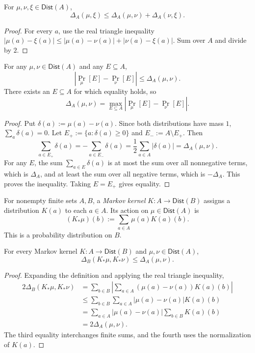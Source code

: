 \begin{lemma}\label{lem:security:tv-triangle}
For $\mu,\nu,\xi\in\mathsf{Dist}(A)$,
\[
 \Delta_A(\mu,\xi)\leq\Delta_A(\mu,\nu)+\Delta_A(\nu,\xi).
\]
\end{lemma}
\begin{proof}
For every $a$, use the real triangle inequality
$|\mu(a)-\xi(a)|\leq|\mu(a)-\nu(a)|+|\nu(a)-\xi(a)|$. Sum over $A$ and divide by $2$.
\end{proof}

\begin{lemma}\label{lem:security:events}
For any $\mu,\nu\in\mathsf{Dist}(A)$ and any $E\subseteq A$,
\[
 |\Pr_\mu[E]-\Pr_\nu[E]|\leq\Delta_A(\mu,\nu).
\]
There exists an $E\subseteq A$ for which equality holds, so
\[
 \Delta_A(\mu,\nu)=\max_{E\subseteq A}|\Pr_\mu[E]-\Pr_\nu[E]|.
\]
\end{lemma}
\begin{proof}
Put $\delta(a):=\mu(a)-\nu(a)$. Since both distributions have mass $1$, $\sum_a\delta(a)=0$. Let $E_+:=\{a:\delta(a)\geq0\}$ and $E_-:=A\setminus E_+$. Then
\[
 \sum_{a\in E_+}\delta(a)=-\sum_{a\in E_-}\delta(a)
   =\frac12\sum_{a\in A}|\delta(a)|=\Delta_A(\mu,\nu).
\]
For any $E$, the sum $\sum_{a\in E}\delta(a)$ is at most the sum over all nonnegative terms, which is $\Delta_A$, and at least the sum over all negative terms, which is $-\Delta_A$. This proves the inequality. Taking $E=E_+$ gives equality.
\end{proof}

\begin{definition}\label{def:security:kernel}
For nonempty finite sets $A,B$, a \emph{Markov kernel} $K:A\to\mathsf{Dist}(B)$ assigns a distribution $K(a)$ to each $a\in A$. Its action on $\mu\in\mathsf{Dist}(A)$ is
\[
 (K_*\mu)(b):=\sum_{a\in A}\mu(a)K(a)(b).
\]
This is a probability distribution on $B$.
\end{definition}

\begin{lemma}\label{lem:security:data-processing}
For every Markov kernel $K:A\to\mathsf{Dist}(B)$ and $\mu,\nu\in\mathsf{Dist}(A)$,
\[
 \Delta_B(K_*\mu,K_*\nu)\leq\Delta_A(\mu,\nu).
\]
\end{lemma}
\begin{proof}
Expanding the definition and applying the real triangle inequality,
\begin{align*}
2\Delta_B(K_*\mu,K_*\nu)
 &=\sum_{b\in B}\left|\sum_{a\in A}(\mu(a)-\nu(a))K(a)(b)\right|\\
 &\leq\sum_{b\in B}\sum_{a\in A}|\mu(a)-\nu(a)|K(a)(b)\\
 &=\sum_{a\in A}|\mu(a)-\nu(a)|\sum_{b\in B}K(a)(b)\\
 &=2\Delta_A(\mu,\nu).
\end{align*}
The third equality interchanges finite sums, and the fourth uses the normalization of $K(a)$.
\end{proof}

